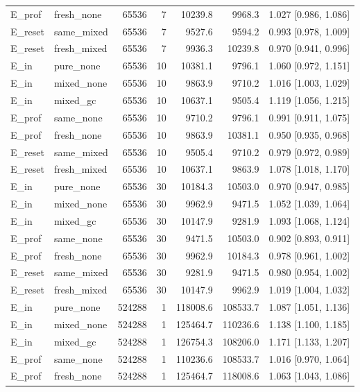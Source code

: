 \begin{longtable}{llrrrrc}
E\_prof & fresh\_none & 65536 & 7 & 10239.8 & 9968.3 & 1.027 [0.986, 1.086] \\
E\_reset & same\_mixed & 65536 & 7 & 9527.6 & 9594.2 & 0.993 [0.978, 1.009] \\
E\_reset & fresh\_mixed & 65536 & 7 & 9936.3 & 10239.8 & 0.970 [0.941, 0.996] \\
E\_in & pure\_none & 65536 & 10 & 10381.1 & 9796.1 & 1.060 [0.972, 1.151] \\
E\_in & mixed\_none & 65536 & 10 & 9863.9 & 9710.2 & 1.016 [1.003, 1.029] \\
E\_in & mixed\_gc & 65536 & 10 & 10637.1 & 9505.4 & 1.119 [1.056, 1.215] \\
E\_prof & same\_none & 65536 & 10 & 9710.2 & 9796.1 & 0.991 [0.911, 1.075] \\
E\_prof & fresh\_none & 65536 & 10 & 9863.9 & 10381.1 & 0.950 [0.935, 0.968] \\
E\_reset & same\_mixed & 65536 & 10 & 9505.4 & 9710.2 & 0.979 [0.972, 0.989] \\
E\_reset & fresh\_mixed & 65536 & 10 & 10637.1 & 9863.9 & 1.078 [1.018, 1.170] \\
E\_in & pure\_none & 65536 & 30 & 10184.3 & 10503.0 & 0.970 [0.947, 0.985] \\
E\_in & mixed\_none & 65536 & 30 & 9962.9 & 9471.5 & 1.052 [1.039, 1.064] \\
E\_in & mixed\_gc & 65536 & 30 & 10147.9 & 9281.9 & 1.093 [1.068, 1.124] \\
E\_prof & same\_none & 65536 & 30 & 9471.5 & 10503.0 & 0.902 [0.893, 0.911] \\
E\_prof & fresh\_none & 65536 & 30 & 9962.9 & 10184.3 & 0.978 [0.961, 1.002] \\
E\_reset & same\_mixed & 65536 & 30 & 9281.9 & 9471.5 & 0.980 [0.954, 1.002] \\
E\_reset & fresh\_mixed & 65536 & 30 & 10147.9 & 9962.9 & 1.019 [1.004, 1.032] \\
E\_in & pure\_none & 524288 & 1 & 118008.6 & 108533.7 & 1.087 [1.051, 1.136] \\
E\_in & mixed\_none & 524288 & 1 & 125464.7 & 110236.6 & 1.138 [1.100, 1.185] \\
E\_in & mixed\_gc & 524288 & 1 & 126754.3 & 108206.0 & 1.171 [1.133, 1.207] \\
E\_prof & same\_none & 524288 & 1 & 110236.6 & 108533.7 & 1.016 [0.970, 1.064] \\
E\_prof & fresh\_none & 524288 & 1 & 125464.7 & 118008.6 & 1.063 [1.043, 1.086] \\

\end{longtable}
